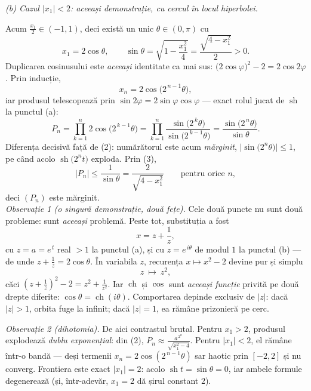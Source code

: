 \medskip
\emph{(b) Cazul $|x_{1}|<2$: aceeași demonstrație, cu cercul în locul hiperbolei.}

Acum $\frac{x_{1}}{2}\in(-1,1)$, deci există un unic $\theta\in(0,\pi)$ cu
\[ x_{1}=2\cos\theta,\qquad \sin\theta=\sqrt{1-\frac{x_{1}^{2}}{4}}=\frac{\sqrt{4-x_{1}^{2}}}{2}>0 . \tag{3} \]
Duplicarea cosinusului este \emph{aceeași} identitate ca mai sus: $\bigl(2\cos\varphi\bigr)^{2}-2=2\cos2\varphi$. Prin inducție,
\[ x_{n}=2\cos\bigl(2^{\,n-1}\theta\bigr) , \]
iar produsul telescopează prin $\sin2\varphi=2\sin\varphi\cos\varphi$ --- exact rolul jucat de $\operatorname{sh}$ la punctul (a):
\[ P_{n}=\prod_{k=1}^{n}2\cos\bigl(2^{\,k-1}\theta\bigr)=\prod_{k=1}^{n}\frac{\sin\bigl(2^{\,k}\theta\bigr)}{\sin\bigl(2^{\,k-1}\theta\bigr)}=\frac{\sin\bigl(2^{\,n}\theta\bigr)}{\sin\theta} . \]
Diferența decisivă față de (2): numărătorul este acum \emph{mărginit}, $\bigl|\sin\bigl(2^{n}\theta\bigr)\bigr|\le1$, pe când acolo $\operatorname{sh}\bigl(2^{n}t\bigr)$ exploda. Prin (3),
\[ \bigl|P_{n}\bigr|\le\frac{1}{\sin\theta}=\frac{2}{\sqrt{4-x_{1}^{2}}}\qquad\text{pentru orice }n , \]
deci $(P_{n})$ este mărginit.\\[2pt]
\emph{Observație 1 (o singură demonstrație, două fețe).} Cele două puncte nu sunt două probleme: sunt \emph{aceeași} problemă. Peste tot, substituția a fost
\[ x=z+\frac1z , \]
cu $z=a=e^{\,t}$ real $>1$ la punctul (a), și cu $z=e^{\,i\theta}$ de modul $1$ la punctul (b) --- de unde $z+\frac1z=2\cos\theta$. În variabila $z$, recurența $x\mapsto x^{2}-2$ devine pur și simplu
\[ z\ \longmapsto\ z^{2} , \]
căci $\left(z+\frac1z\right)^{2}-2=z^{2}+\frac{1}{z^{2}}$. Iar $\operatorname{ch}$ și $\cos$ sunt \emph{aceeași funcție} privită pe două drepte diferite: $\cos\theta=\operatorname{ch}(i\theta)$. Comportarea depinde exclusiv de $|z|$: dacă $|z|>1$, orbita fuge la infinit; dacă $|z|=1$, ea rămâne prizonieră pe cerc.

\emph{Observație 2 (dihotomia).} De aici contrastul brutal. Pentru $x_{1}>2$, produsul explodează \emph{dublu exponențial}: din (2), $P_{n}\approx\frac{a^{\,2^{n}}}{\sqrt{x_{1}^{2}-4}}$. Pentru $|x_{1}|<2$, el rămâne într-o bandă --- deși termenii $x_{n}=2\cos(2^{\,n-1}\theta)$ sar haotic prin $[-2,2]$ și nu converg. Frontiera este exact $|x_{1}|=2$: acolo $\operatorname{sh}t=\sin\theta=0$, iar ambele formule degenerează (și, într-adevăr, $x_{1}=2$ dă șirul constant $2$).

